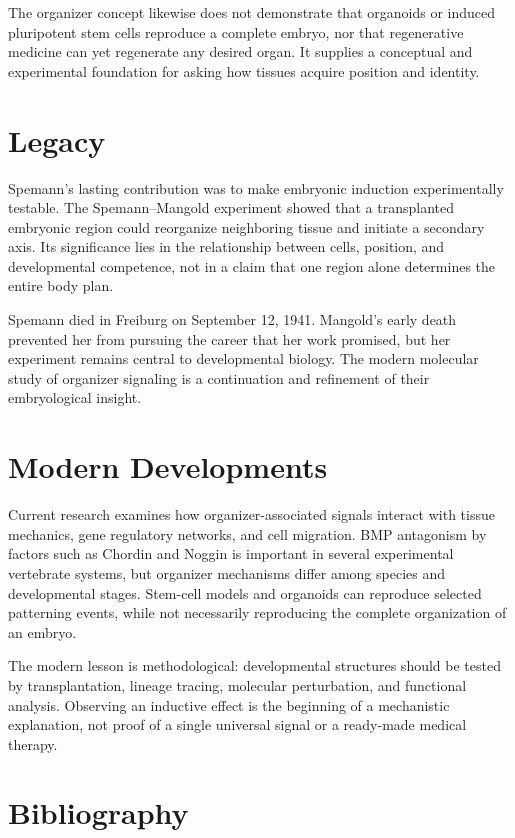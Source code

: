 The organizer concept likewise does not demonstrate that organoids or induced pluripotent stem cells reproduce a complete embryo, nor that regenerative medicine can yet regenerate any desired organ. It supplies a conceptual and experimental foundation for asking how tissues acquire position and identity.

\section{Legacy}

Spemann's lasting contribution was to make embryonic induction experimentally testable. The Spemann--Mangold experiment showed that a transplanted embryonic region could reorganize neighboring tissue and initiate a secondary axis. Its significance lies in the relationship between cells, position, and developmental competence, not in a claim that one region alone determines the entire body plan.

Spemann died in Freiburg on September 12, 1941. Mangold's early death prevented her from pursuing the career that her work promised, but her experiment remains central to developmental biology. The modern molecular study of organizer signaling is a continuation and refinement of their embryological insight.

\section{Modern Developments}

Current research examines how organizer-associated signals interact with tissue mechanics, gene regulatory networks, and cell migration. BMP antagonism by factors such as Chordin and Noggin is important in several experimental vertebrate systems, but organizer mechanisms differ among species and developmental stages. Stem-cell models and organoids can reproduce selected patterning events, while not necessarily reproducing the complete organization of an embryo.

The modern lesson is methodological: developmental structures should be tested by transplantation, lineage tracing, molecular perturbation, and functional analysis. Observing an inductive effect is the beginning of a mechanistic explanation, not proof of a single universal signal or a ready-made medical therapy.

\section{Bibliography}

